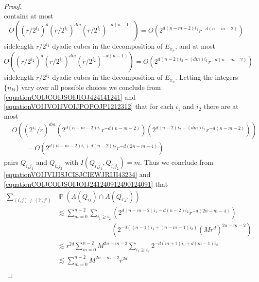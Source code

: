 \documentclass[dvipsnames,letterpaper,12pt]{article}
\numberwithin{equation}{section}
\numberwithin{theorem}{section}
\DeclareMathOperator{\PP}{\mathbb{P}}
\begin{document}
\begin{proof}
\begin{equation}
    \end{equation}
    contains at most
    \begin{equation} \label{equationCOIJCOIJSOIJIOJ424141241}
        O \left( (r/2^{i_1})^d (r/2^{i_1})^{dm} (r/2^{i_1})^{-d(n-1)} \right) = O \left( 2^{d(n-m-2)i_1} r^{-d(n-m-2)} \right)
    \end{equation}
    sidelength $r/2^{i_1}$ dyadic cubes in the decomposition of $E_{x_n}$, and at most
    \begin{equation} \label{equationVOIJVOIJVOIJPOPOJP1212312}
        O \left( (r/2^{i_2})^d (r/2^{i_1})^{dm} (r/2^{i_2})^{-d(n-1)} \right) = O \left( 2^{d(n-2) i_2 - (dm) i_1} r^{-d(n-m-2)} \right)
    \end{equation}
    sidelength $r/2^{i_2}$ dyadic cubes in the decomposition of $E_{x_n}$. Letting the integers $\{ n_{kl} \}$ vary over all possible choices we conclude from \eqref{equationCOIJCOIJSOIJIOJ424141241} and \eqref{equationVOIJVOIJVOIJPOPOJP1212312} that for each $i_1$ and $i_2$ there are at most
    \begin{equation} \label{equationCOIJCOIJSOIJOIJ241240912490124091}
    \begin{split}
        &O \left( (2^{i_1}/r)^{dm} \left( 2^{d(n-m-2)i_1} r^{-d(n-m-2)} \right) \left( 2^{d(n-2) i_2 - (dm) i_1} r^{-d(n-m-2)} \right) \right)\\
        &\quad\quad = O \left( 2^{d(n - m - 2)i_1 + d(n-2) i_2} r^{-d(2n - m - 4)} \right)
    \end{split}
    \end{equation}
    pairs $Q_{i_1j_1}$ and $Q_{i_2j_2}$ with $I(Q_{i_1j_1},Q_{i_2j_2}) = m$. Thus we conclude from \eqref{equationVOIJVIJISJCISJCIEWJRIJI43234} and \eqref{equationCOIJCOIJSOIJOIJ241240912490124091} that
    \begin{equation} \label{equationPPOPOKPOPPPPPPDSDSD}
    \begin{split}
        \sum_{(i,j) \neq (i',j')}& \PP(A(Q_{ij}) \cap A(Q_{i'j'}))\\
        &\lesssim \sum_{m = 0}^{n-2} \sum_{i_1 \geq i_2} \left( 2^{d(n-m-2) i_1 + d(n-2) i_2} r^{-d(2n-m-4)} \right)\\
        &\quad\quad\quad\quad\quad\quad\quad\quad\left( 2^{-d((n-1)i_1 + (n-m-1) i_2)} (Mr^d)^{2n - m - 2} \right)\\
        &\lesssim r^{2d} \sum_{m = 0}^{n-2} M^{2n-m-2} \sum_{i_1 \geq i_2} 2^{-d(m+1)i_1 + d(m-1)i_2}\\
        &\lesssim \sum_{m = 0}^{n-2} M^{2n-m-2} r^{2d}\\

\end{split}
\end{equation}
\end{proof}
\end{document}
